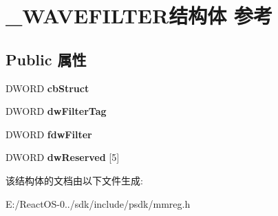 \hypertarget{struct___w_a_v_e_f_i_l_t_e_r}{}\section{\+\_\+\+W\+A\+V\+E\+F\+I\+L\+T\+E\+R结构体 参考}
\label{struct___w_a_v_e_f_i_l_t_e_r}
\subsection*{Public 属性}
\begin{DoxyCompactItemize}
\item 
\mbox{\label{struct___w_a_v_e_f_i_l_t_e_r_ab3b4a02e227f90d0a11466d88c795853}} 
D\+W\+O\+RD {\bfseries cb\+Struct}
\item 
\mbox{\label{struct___w_a_v_e_f_i_l_t_e_r_a79b144c6753c242469e16aeb7198a389}} 
D\+W\+O\+RD {\bfseries dw\+Filter\+Tag}
\item 
\mbox{\label{struct___w_a_v_e_f_i_l_t_e_r_a8aedd9fa8d87b4c4cf70d358a9367a93}} 
D\+W\+O\+RD {\bfseries fdw\+Filter}
\item 
\mbox{\label{struct___w_a_v_e_f_i_l_t_e_r_ad20ba75cebca3860bb12b63d438a5096}} 
D\+W\+O\+RD {\bfseries dw\+Reserved} \mbox{[}5\mbox{]}
\end{DoxyCompactItemize}


该结构体的文档由以下文件生成\+:\begin{DoxyCompactItemize}
\item 
E\+:/\+React\+O\+S-\/0../sdk/include/psdk/mmreg.\+h\end{DoxyCompactItemize}
